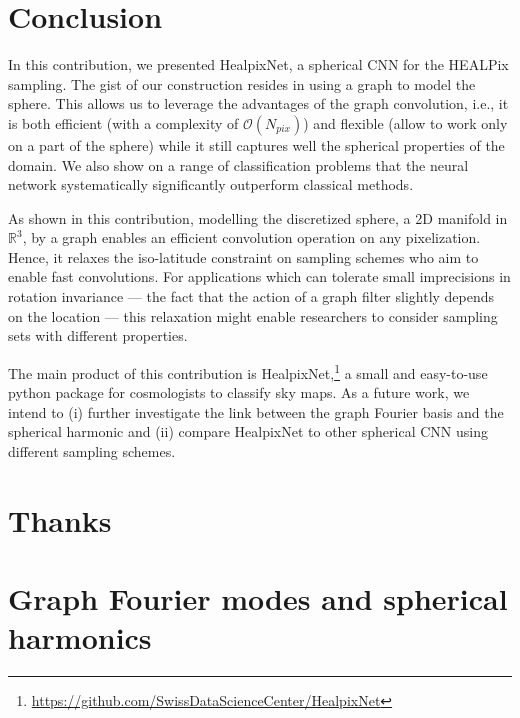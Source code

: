 \documentclass[final,twocolumn,3p,times,authoryear]{elsarticle}
\newcommand{\nati}[1]{{\color[rgb]{.1,.6,.1}{#1}}}
\newcommand{\1}{\b{1}}              %
\newcommand{\0}{\b{0}}              %
\newcommand{\R}{\mathbb{R}}
\begin{document}
\nati{Should the discussion be merged with the result section?}

\section{Conclusion}
\label{sec:conclusion}

In this contribution, we presented HealpixNet, a spherical CNN for the HEALPix sampling. The gist of our construction resides in using a graph to model the sphere.
This allows us to leverage the advantages of the graph convolution, i.e., it is both efficient (with a complexity of $\mathcal{O}(N_{pix})$) and flexible (allow to work only on a part of the sphere) while it still captures well the spherical properties of the domain.
We also show on a range of classification problems that the neural network systematically significantly outperform classical methods.

As shown in this contribution, modelling the discretized sphere, a 2D manifold in $\R^3$, by a graph enables an efficient convolution operation on any pixelization. Hence, it relaxes the iso-latitude constraint on sampling schemes who aim to enable fast convolutions. For applications which can tolerate small imprecisions in rotation invariance --- the fact that the action of a graph filter slightly depends on the location --- this relaxation might enable researchers to consider sampling sets with different properties.

The main product of this contribution is HealpixNet,\footnote{\url{https://github.com/SwissDataScienceCenter/HealpixNet}} a small and easy-to-use python package for cosmologists to classify sky maps.
As a future work, we intend to (i) further investigate the link between the graph Fourier basis and the spherical harmonic and (ii) compare HealpixNet to other spherical CNN using different sampling schemes.

\section*{Thanks}

\appendix

\section{Graph Fourier modes and spherical harmonics}
\label{sec:comparison_spherical_harmonics}
\label{sec:border_effects}
\end{document}
